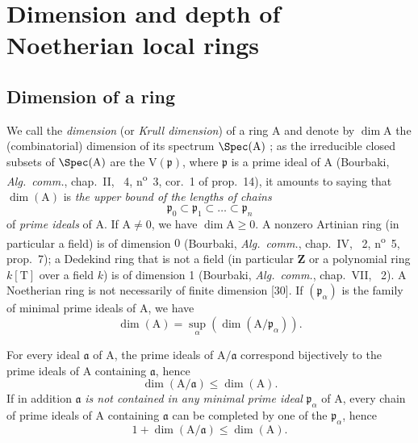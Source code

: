 \section{Dimension and depth of Noetherian local rings}
\label{section:0.16}

\subsection{Dimension of a ring}
\label{subsection:0.16.1}
\label{0.16.1}

\begin{env}[16.1.1]
\label{0.16.1.1}
We call the \emph{dimension} (or \emph{Krull dimension}) of a ring $\mathrm{A}$ and denote by $\dim\mathrm{A}$ the (combinatorial) dimension of its spectrum $\Spec(\mathrm{A})$ ; as the irreducible closed subsets of $\Spec(\mathrm{A})$ are the $\mathrm{V}(\mathfrak{p})$, where $\mathfrak{p}$ is a prime ideal of $\mathrm{A}$ (Bourbaki, \emph{Alg.~comm.}, chap.~II, \textsection~4, n\textsuperscript{o}~3, cor.~1 of prop.~14), it amounts to saying that $\dim(\mathrm{A})$ is \emph{the upper bound of the lengths of chains} 
\[
  \mathfrak{p}_0\subset\mathfrak{p}_1\subset\ldots\subset\mathfrak{p}_n
\]
of \emph{prime ideals} of $\mathrm{A}$.
If $\mathrm{A}\neq 0$, we have $\dim\mathrm{A}\geq 0$.
A nonzero Artinian ring (in particular a field) is of dimension $0$ (Bourbaki, \emph{Alg.~comm.}, chap.~IV, \textsection~2, n\textsuperscript{o}~5, prop.~7); a Dedekind ring that is not a field (in particular $\mathbf{Z}$ or a polynomial ring $k[\mathrm{T}]$ over a field $k$) is of dimension 1 (Bourbaki, \emph{Alg.~comm.}, chap.~VII, \textsection~2).
A Noetherian ring is not necessarily of finite dimension [30].
If $(\mathfrak{p}_\alpha)$ is the family of minimal prime ideals of $\mathrm{A}$, we have 
\begin{equation}
\label{0.16.1.1.1}
\tag{16.1.1.1}
  \dim(\mathrm{A})=\sup_\alpha(\dim(\mathrm{A}/\mathfrak{p}_\alpha)).
\end{equation}
\end{env}

\begin{env}[16.1.2]
\label{0.16.1.2}
For every ideal $\mathfrak{a}$ of $\mathrm{A}$, the prime ideals of $\mathrm{A}/\mathfrak{a}$ correspond bijectively to the prime ideals of $\mathrm{A}$ containing $\mathfrak{a}$, hence
\begin{equation}
\label{0.16.1.2.1}
\tag{16.1.2.1}
  \dim(\mathrm{A}/\mathfrak{a})\leq\dim(\mathrm{A}).
\end{equation}
If in addition $\mathfrak{a}$ \emph{is not contained in any minimal prime ideal} $\mathfrak{p}_\alpha$ of $\mathrm{A}$, every chain of prime ideals of $\mathrm{A}$ containing $\mathfrak{a}$ can be completed by one of the $\mathfrak{p}_\alpha$, hence
\begin{equation}
\label{0.16.1.2.2}
\tag{16.1.2.2}
  1+\dim(\mathrm{A}/\mathfrak{a})\leq\dim(\mathrm{A}).
\end{equation}
\end{env}

